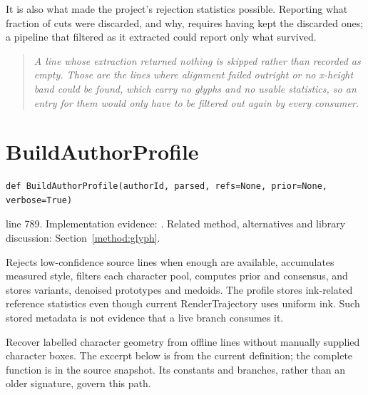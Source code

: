 It is also what made the project's rejection statistics possible. Reporting what fraction of cuts were discarded, and why, requires having kept the discarded ones; a pipeline that filtered as it extracted could report only what survived.


\begin{quote}\small\itshape A line whose extraction returned nothing is skipped rather than recorded as empty. Those are the lines where alignment failed outright or no x-height band could be found, which carry no glyphs and no usable statistics, so an entry for them would only have to be filtered out again by every consumer.\end{quote}


\section{BuildAuthorProfile}\label{fn:style:BuildAuthorProfile}
\begin{lstlisting}[style=sig]
def BuildAuthorProfile(authorId, parsed, refs=None, prior=None, verbose=True)
\end{lstlisting}
 line 789. Implementation evidence: \cite{code2026}. Related method, alternatives and library discussion: Section~\ref{method:glyph}.


Rejects low-confidence source lines when enough are available, accumulates measured style, filters each character pool, computes prior and consensus, and stores variants, denoised prototypes and medoids. The profile stores ink-related reference statistics even though current RenderTrajectory uses uniform ink. Such stored metadata is not evidence that a live branch consumes it.


Recover labelled character geometry from offline lines without manually supplied character boxes. The excerpt below is from the current definition; the complete function is in the source snapshot. Its constants and branches, rather than an older signature, govern this path.


